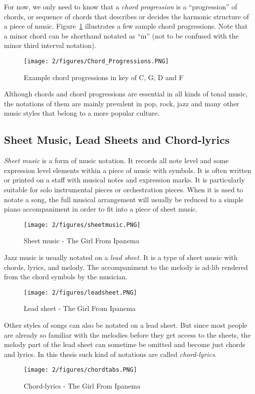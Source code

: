For now, we only need to know that a {\it chord progression} is a ``progression'' of chords, or sequence of chords that describes or decides the harmonic structure of a piece of music. Figure~\ref{fig:2-chordprogression} illustrates a few sample chord progressions. Note that a minor chord can be shorthand notated as ``m'' (not to be confused with the minor third interval notation).
\begin{figure}[htb]
\centering
\texttt{[image: 2/figures/Chord\_Progressions.PNG]}
\caption{Example chord progressions in key of C, G, D and F}
\label{fig:2-chordprogression}
\end{figure}
Although chords and chord progressions are essential in all kinds of tonal music, the notations of them are mainly prevalent in pop, rock, jazz and many other music styles that belong to a more popular culture.

\subsection{Sheet Music, Lead Sheets and Chord-lyrics}
{\it Sheet music} is a form of music notation. It records all note level and some expression level elements within a piece of music with symbols. It is often written or printed on a staff with musical notes and expression marks. It is particularly suitable for solo instrumental pieces or orchestration pieces. When it is used to notate a song, the full musical arrangement will usually be reduced to a simple piano accompaniment in order to fit into a piece of sheet music.
\begin{figure}[htb]
	\centering
	\texttt{[image: 2/figures/sheetmusic.PNG]}
	\caption{Sheet music - The Girl From Ipanema}
	\label{fig:2-sheetmusic}
\end{figure}

Jazz music is usually notated on a {\it lead sheet}. It is a type of sheet music with chords, lyrics, and melody. The accompaniment to the melody is ad-lib rendered from the chord symbols by the musician.
\begin{figure}[htb]
	\centering
	\texttt{[image: 2/figures/leadsheet.PNG]}
	\caption{Lead sheet - The Girl From Ipanema}
	\label{fig:2-leadsheet}
\end{figure}

Other styles of songs can also be notated on a lead sheet. But since most people are already so familiar with the melodies before they get access to the sheets, the melody part of the lead sheet can sometime be omitted and become just chords and lyrics. In this thesis such kind of notations are called {\it chord-lyrics}.
\begin{figure}[htb]
	\centering
	\texttt{[image: 2/figures/chordtabs.PNG]}
	\caption{Chord-lyrics - The Girl From Ipanema}
	\label{fig:2-chordtabs}
\end{figure}



